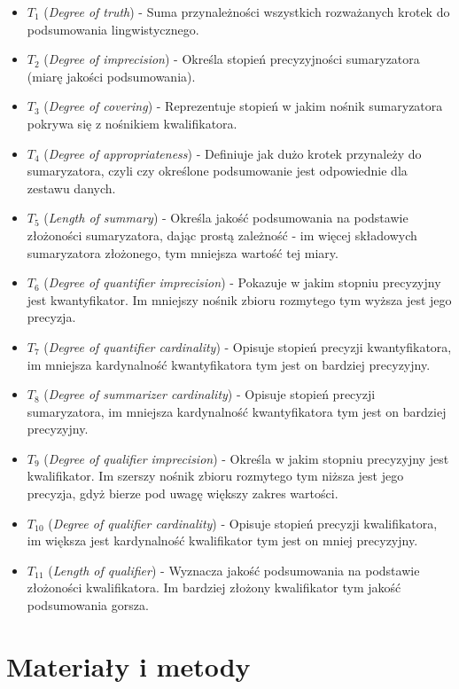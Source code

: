 \documentclass{classrep}
\begin{document}
\begin{itemize}
    \item $T_1$ (\emph{Degree of truth}) - Suma przynależności wszystkich rozważanych krotek do podsumowania lingwistycznego.
    \item $T_2$ (\emph{Degree of imprecision}) - Określa stopień precyzyjności sumaryzatora (miarę jakości podsumowania).
    \item $T_3$ (\emph{Degree of covering}) - Reprezentuje stopień w jakim nośnik sumaryzatora pokrywa się z nośnikiem kwalifikatora.
    \item $T_4$ (\emph{Degree of appropriateness}) - Definiuje jak dużo krotek przynależy do sumaryzatora, czyli czy określone podsumowanie jest odpowiednie dla zestawu danych.
    \item $T_5$ (\emph{Length of summary}) - Określa jakość podsumowania na podstawie złożoności sumaryzatora, dając prostą zależność - im więcej składowych sumaryzatora złożonego, tym mniejsza wartość tej miary.
    \item $T_6$ (\emph{Degree of quantifier imprecision}) - Pokazuje w jakim stopniu precyzyjny jest kwantyfikator. Im mniejszy nośnik zbioru rozmytego tym wyższa jest jego precyzja.
    \item $T_7$ (\emph{Degree of quantifier cardinality}) - Opisuje stopień precyzji kwantyfikatora, im mniejsza kardynalność kwantyfikatora tym jest on bardziej precyzyjny.
    \item $T_8$ (\emph{Degree of summarizer cardinality}) - Opisuje stopień precyzji sumaryzatora, im mniejsza kardynalność kwantyfikatora tym jest on bardziej precyzyjny.
    \item $T_9$ (\emph{Degree of qualifier imprecision}) - Określa w jakim stopniu precyzyjny jest kwalifikator. Im szerszy nośnik zbioru rozmytego tym niższa jest jego precyzja, gdyż bierze pod uwagę większy zakres wartości.
    \item $T_{10}$ (\emph{Degree of qualifier cardinality}) - Opisuje stopień precyzji kwalifikatora, im większa jest kardynalność kwalifikator tym jest on mniej precyzyjny.
    \item $T_{11}$ (\emph{Length of qualifier}) - Wyznacza jakość podsumowania na podstawie złożoności kwalifikatora. Im bardziej złożony kwalifikator tym jakość podsumowania gorsza.
\end{itemize}
\section{Materiały i metody}
\end{document}
